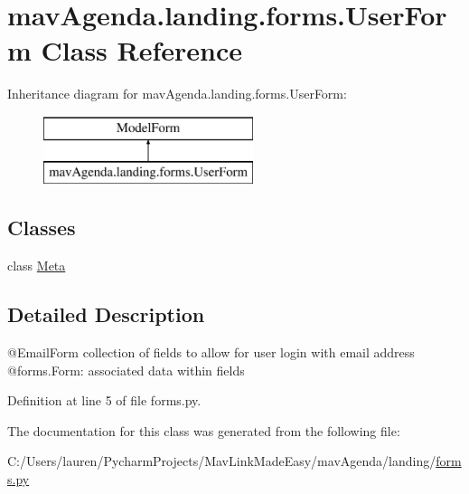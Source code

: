 \hypertarget{classmavAgenda_1_1landing_1_1forms_1_1UserForm}{}\section{mav\+Agenda.\+landing.\+forms.\+User\+Form Class Reference}
\label{classmavAgenda_1_1landing_1_1forms_1_1UserForm}
Inheritance diagram for mav\+Agenda.\+landing.\+forms.\+User\+Form\+:\begin{figure}[H]
\begin{center}
\leavevmode
\includegraphics[height=2.000000cm]{classmavAgenda_1_1landing_1_1forms_1_1UserForm}
\end{center}
\end{figure}
\subsection*{Classes}
\begin{DoxyCompactItemize}
\item 
class \mbox{\hyperlink{classmavAgenda_1_1landing_1_1forms_1_1UserForm_1_1Meta}{Meta}}
\end{DoxyCompactItemize}


\subsection{Detailed Description}
\begin{DoxyVerb}@EmailForm collection of fields to allow for user login with email address
@forms.Form: associated data within fields
\end{DoxyVerb}
 

Definition at line 5 of file forms.\+py.



The documentation for this class was generated from the following file\+:\begin{DoxyCompactItemize}
\item 
C\+:/\+Users/lauren/\+Pycharm\+Projects/\+Mav\+Link\+Made\+Easy/mav\+Agenda/landing/\mbox{\hyperlink{forms_8py}{forms.\+py}}\end{DoxyCompactItemize}
